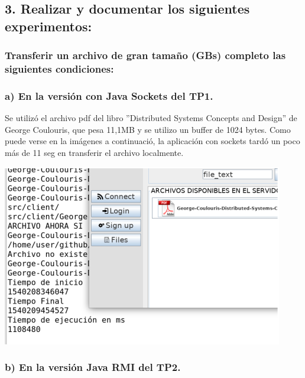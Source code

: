 \documentclass[11pt]{extarticle}
\begin{document}
    \hypertarget{realizar-y-documentar-los-siguientes-experimentos}{%
\subsection{3. Realizar y documentar los siguientes
experimentos:}\label{realizar-y-documentar-los-siguientes-experimentos}}

    \hypertarget{transferir-un-archivo-de-gran-tamauxf1o-gbs-completo-las-siguientes-condiciones}{%
\subsubsection{Transferir un archivo de gran tamaño (GBs) completo las
siguientes
condiciones:}\label{transferir-un-archivo-de-gran-tamauxf1o-gbs-completo-las-siguientes-condiciones}}

    \hypertarget{a-en-la-versiuxf3n-con-java-sockets-del-tp1.}{%
\subsubsection{a) En la versión con Java Sockets del
TP1.}\label{a-en-la-versiuxf3n-con-java-sockets-del-tp1.}}

    Se utilizó el archivo pdf del libro ''Distributed Systems Concepts and
Design'' de George Coulouris, que pesa 11,1MB y se utilizo un buffer de
1024 bytes. Como puede verse en la imágenes a continuació, la aplicación
con sockets tardó un poco más de 11 seg en transferir el archivo
localmente.

\includegraphics{images/cronometro-1.png}

    \hypertarget{b-en-la-versiuxf3n-java-rmi-del-tp2.}{%
\subsubsection{b) En la versión Java RMI del
TP2.}\label{b-en-la-versiuxf3n-java-rmi-del-tp2.}}
\end{document}
